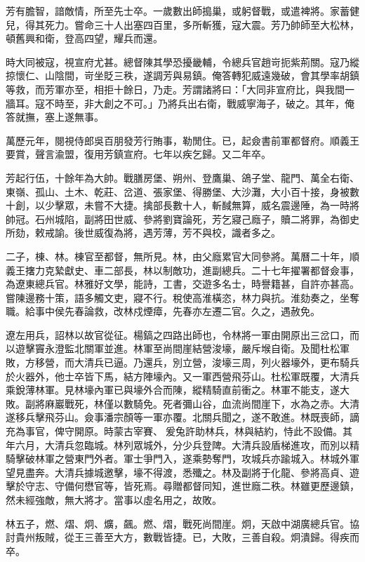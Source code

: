 \begin{pinyinscope}
芳有膽智，諳敵情，所至先士卒。一歲數出師搗巢，或躬督戰，或遣裨將。家蓄健兒，得其死力。嘗命三十人出塞四百里，多所斬獲，寇大震。芳乃帥師至大松林，頓舊興和衛，登高四望，耀兵而還。

時大同被寇，視宣府尤甚。總督陳其學恐擾畿輔，令總兵官趙岢扼紫荊關。寇乃縱掠懷仁、山陰間，岢坐貶三秩，遂調芳與易鎮。俺答轉犯威遠幾破，會其學率胡鎮等救，而芳軍亦至，相拒十餘日，乃走。芳謂諸將曰：「大同非宣府比，與我間一牆耳。寇不時至，非大創之不可。」乃將兵出右衛，戰威寧海子，破之。其年，俺答就撫，塞上遂無事。

萬歷元年，閱視侍郎吳百朋發芳行賄事，勒閒住。已，起僉書前軍都督府。順義王要賞，聲言渝盟，復用芳鎮宣府。七年以疾乞歸。又二年卒。

芳起行伍，十餘年為大帥。戰膳房堡、朔州、登鷹巢、鴿子堂、龍門、萬全右衛、東嶺、孤山、土木、乾莊、岔道、張家堡、得勝堡、大沙灘，大小百十接，身被數十創，以少擊眾，未嘗不大捷。擒部長數十人，斬馘無算，威名震邊陲，為一時將帥冠。石州城陷，副將田世威、參將劉寶論死，芳乞寢己廕子，贖二將罪，為御史所劾，敕戒諭。後世威復為將，遇芳薄，芳不與校，識者多之。

二子，棟、林。棟官至都督，無所見。林，由父廕累官大同參將。萬曆二十年，順義王撦力克縶獻史、車二部長，林以制敵功，進副總兵。二十七年擢署都督僉事，為遼東總兵官。林雅好文學，能詩，工書，交遊多名士，時譽籍甚，自許亦甚高。嘗陳邊務十策，語多觸文吏，寢不行。稅使高淮橫恣，林力與抗。淮劾奏之，坐奪職。給事中侯先春論救，改林戍煙瘴，先春亦左遷二官。久之，遇赦免。

遼左用兵，詔林以故官從征。楊鎬之四路出師也，令林將一軍由開原出三岔口，而以遊擊竇永澄監北關軍並進。林軍至尚間崖結營浚壕，嚴斥堠自衛。及聞杜松軍敗，方移營，而大清兵已逼。乃還兵，別立營，浚壕三周，列火器壕外，更布騎兵於火器外，他士卒皆下馬，結方陣壕內。又一軍西營飛芬山。杜松軍既覆，大清兵乘銳薄林軍。見林壕內軍已與壕外合而陳，縱精騎直前衝之。林軍不能支，遂大敗。副將麻巖戰死，林僅以數騎免。死者彌山谷，血流尚間崖下，水為之赤。大清遂移兵擊飛芬山。僉事潘宗顏等一軍亦覆。北關兵聞之，遂不敢進。林既喪師，謫充為事官，俾守開原。時蒙古宰賽、爰兔許助林兵，林與結約，恃此不設備。其年六月，大清兵忽臨城。林列眾城外，分少兵登陴。大清兵設盾梯進攻，而別以精騎擊破林軍之營東門外者。軍士爭門入，遂乘勢奪門，攻城兵亦踰城入。林城外軍望見盡奔。大清兵據城邀擊，壕不得渡，悉殲之。林及副將于化龍、參將高貞、遊擊於守志、守備何懋官等，皆死焉。尋贈都督同知，進世廕二秩。林雖更歷邊鎮，然未經強敵，無大將才。當事以虛名用之，故敗。

林五子，燃、熠、炯、爌，飆。燃、熠，戰死尚間崖。炯，天啟中湖廣總兵官。協討貴州叛賊，從王三善至大方，數戰皆捷。已，大敗，三善自殺。炯潰歸。得疾而卒。


\end{pinyinscope}
